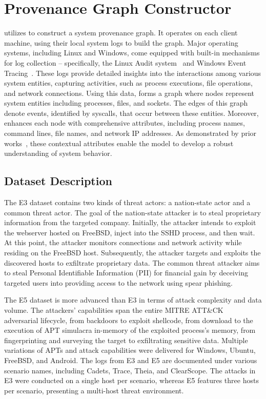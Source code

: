\appendix


\section{Provenance Graph Constructor}
\label{sub:provconstruct}

\Sys utilizes \logs to construct a system provenance graph. It operates on each client machine, using their local system logs to build the graph. Major operating systems, including Linux and Windows, come equipped with built-in mechanisms for log collection -- specifically, the Linux Audit system~\cite{linuxaudit} and Windows Event Tracing~\cite{windowsaudit}. These logs provide detailed insights into the interactions among various system entities, capturing activities, such as process executions, file operations, and network connections. Using this data, \Sys forms a graph where nodes represent system entities including processes, files, and sockets. The edges of this graph denote events, identified by syscalls, that occur between these entities. Moreover, \Sys enhances each node with comprehensive attributes, including process names, command lines, file names, and network IP addresses. As demonstrated by prior works~\cite{flash2024,cheng2023kairos}, these contextual attributes enable the model to develop a robust understanding of system behavior.

\subsection*{Dataset Description}
\label{sec:dataset:description}

The E3 dataset contains two kinds of threat actors: a nation-state actor and a common threat actor. The goal of the nation-state attacker is to steal proprietary information from the targeted company. Initially, the attacker intends to exploit the webserver hosted on FreeBSD, inject into the SSHD process, and then wait. At this point, the attacker monitors connections and network activity while residing on the FreeBSD host. Subsequently, the attacker targets and exploits the discovered hosts to exfiltrate proprietary data. The common threat attacker aims to steal Personal Identifiable Information (PII) for financial gain by deceiving targeted users into providing access to the network using spear phishing.

The \darpa E5 dataset is more advanced than E3 in terms of attack complexity and data volume. The attackers' capabilities span the entire MITRE ATT\&CK~\cite{xiong2022cyber} adversarial lifecycle, from backdoors to exploit shellcode, from download to the execution of APT simulacra in-memory of the exploited process’s memory, from fingerprinting and surveying the target to exfiltrating sensitive data. Multiple variations of APTs and attack capabilities were delivered for Windows, Ubuntu, FreeBSD, and Android. The logs from E3 and E5 are documented under various scenario names, including Cadets, Trace, Theia, and ClearScope. The attacks in E3 were conducted on a single host per scenario, whereas E5 features three hosts per scenario, presenting a multi-host threat environment.

